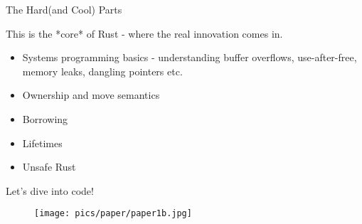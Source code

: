 \documentclass{beamer}
\begin{document}
\begin{frame}{The Hard(and Cool) Parts}

This is the *core* of Rust - where the real innovation
comes in.

\begin{itemize}

\item Systems programming basics - understanding buffer overflows,
      use-after-free, memory leaks, dangling pointers etc.

\item Ownership and move semantics

\item Borrowing

\item Lifetimes

\item Unsafe Rust

      
\end{itemize}

\end{frame}

\begin{frame}{}

Let's dive into code!

\end{frame}
\begin{frame}{}

\begin{figure}
\texttt{[image: pics/paper/paper1b.jpg]}
\end{figure}

\end{frame}
\end{document}
